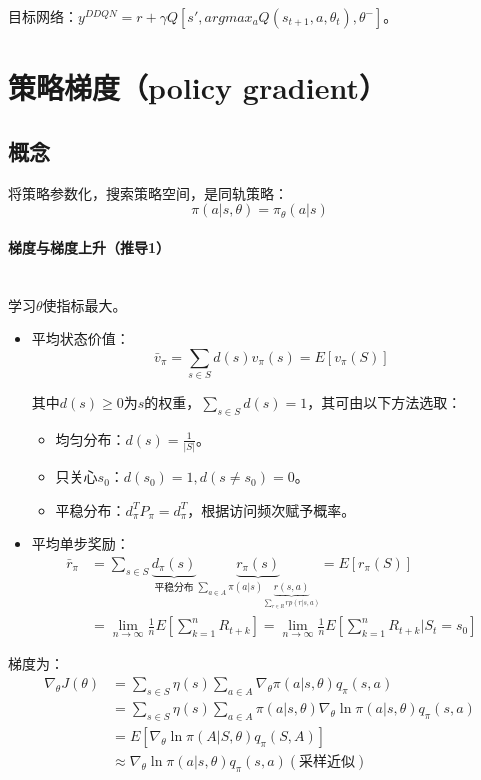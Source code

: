 \documentclass[
12pt, %
a4paper, 
oneside, %
headinclude,footinclude, %
]{scrartcl}
\begin{document}
目标网络：$ y^{DDQN} = r + \gamma Q[s', argmax_a Q(s_{t + 1}, a, \theta_t), \theta^-] $。
\section[策略梯度]{策略梯度（policy gradient）}
\subsection[概念]{概念}
将策略参数化，搜索策略空间，是同轨策略：
$$ \pi(a|s, \theta) = \pi_{\theta}(a|s) $$
\paragraph{梯度与梯度上升（推导1）}~\\

学习$ \theta $使指标最大。
\begin{itemize}
\item 平均状态价值：
$$ \bar{v}_\pi = \sum_{s \in S} d(s) v_\pi(s) = E[v_\pi(S)] $$

其中$ d(s) \geq 0 $为$ s $的权重，$ \sum_{s \in S} d(s) = 1 $，其可由以下方法选取：
\begin{itemize}
\item 均匀分布：$ d(s) = \frac{1}{|S|} $。
\item 只关心$ s_0 $：$ d(s_0) = 1, d(s \neq s_0) = 0 $。
\item 平稳分布：$ d_{\pi}^T P_{\pi} = d_{\pi}^T $，根据访问频次赋予概率。
\end{itemize}
\item 平均单步奖励：
\begin{align*}
\bar{r}_\pi &= \sum_{s \in S} \underbrace{d_{\pi}(s)}_{\text{平稳分布}} \underbrace{r_\pi(s)}_{\sum_{a \in A} \pi(a|s)\underbrace{r(s, a)}_{\sum_{r \in R} r p(r|s, a)}} = E[r_\pi(S)] \\
&= \lim_{n \to \infty} \frac{1}{n}E[\sum_{k = 1}^{n} R_{t + k}] = \lim_{n \to \infty} \frac{1}{n}E[\sum_{k = 1}^{n} R_{t + k}|S_t = s_0]
\end{align*}
\end{itemize}

梯度为：
\begin{align*}
\nabla_\theta J(\theta) &= \sum_{s \in S} \eta(s) \sum_{a \in A} \nabla_\theta \pi(a|s, \theta) q_\pi(s, a) \\
&= \sum_{s \in S} \eta(s) \sum_{a \in A} \pi(a|s, \theta) \nabla_\theta \ln \pi(a|s, \theta) q_\pi(s, a) \\
&= E[\nabla_\theta \ln \pi(A|S, \theta) q_\pi(S, A)] \\
&\approx \nabla_\theta \ln \pi(a|s, \theta) q_\pi(s, a) (\text{采样近似})
\end{align*}
\end{document}
